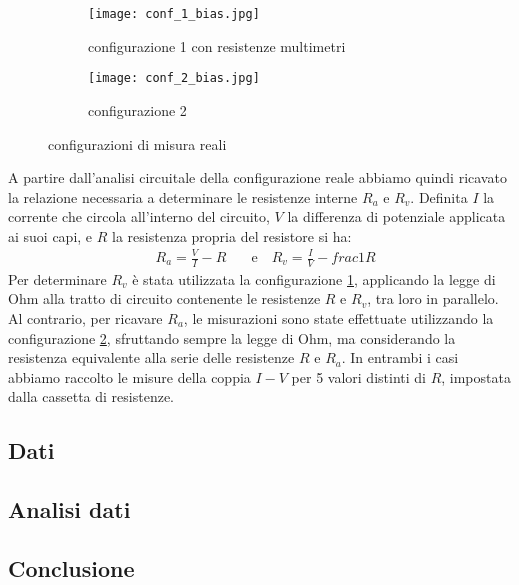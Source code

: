 \documentclass[a4paper]{article}
\begin{document}
\begin{figure}[htbp]
	\centering
	\begin{subfigure}[b]{0.45\textwidth}
		\texttt{[image: conf\_1\_bias.jpg]}
		\caption{configurazione 1 con resistenze multimetri}
		\label{fig:a}
	\end{subfigure}
	\hfill
	\begin{subfigure}[b]{0.45\textwidth}
		\texttt{[image: conf\_2\_bias.jpg]}
		\caption{configurazione 2}
		\label{fig:b}
	\end{subfigure}
	\caption{configurazioni di misura reali}
	\label{fig:3}
\end{figure}
A partire dall'analisi circuitale della configurazione reale abbiamo quindi ricavato la relazione necessaria a determinare le resistenze interne \( \mathit{R_a} \) e \( \mathit{R_v} \).
Definita \( \mathit{I} \) la corrente che circola all'interno del circuito, \( \mathit{V} \) la differenza di potenziale applicata ai suoi capi, e \( \mathit{R} \) la resistenza propria del resistore
si ha:
\begin{align*}
	 & R_a = \frac {V}{I} - R & \quad \text{e} \quad R_v = \frac {I}{V} - frac{1}{R}
\end{align*}
Per determinare \( \mathit{R_v} \) è stata utilizzata la configurazione \ref{fig:a},
applicando la legge di Ohm alla tratto di circuito contenente le resistenze \( \mathit{R} \) e \( \mathit{R_v} \), tra loro in parallelo.
Al contrario, per ricavare \( \mathit{R_a} \), le misurazioni sono state effettuate utilizzando la configurazione \ref{fig:b},
sfruttando sempre la legge di Ohm, ma considerando la resistenza equivalente alla serie delle resistenze \( \mathit{R} \) e \( \mathit{R_a} \).
In entrambi i casi abbiamo raccolto le misure della coppia \( \mathit{I-V} \) per 5 valori distinti di \( \mathit{R} \), impostata dalla cassetta di resistenze.
\subsection{Dati}
\subsection{Analisi dati}
\subsection{Conclusione}


\end{document}

